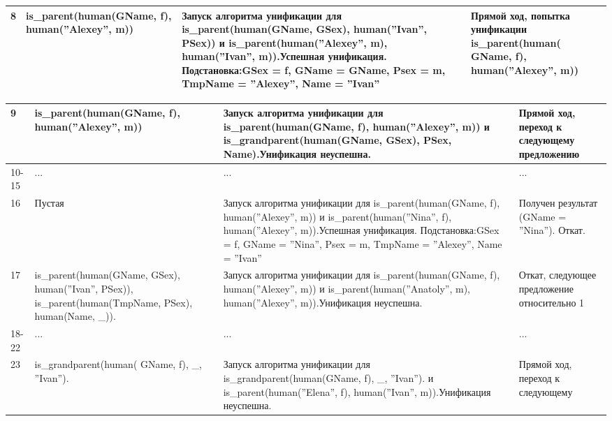\documentclass[12pt]{report}
\begin{document}
\begin{table}[H]
\begin{center}
\begin{tabular}{|p{1 cm}|p{5 cm}|p{8.5 cm}|p{4 cm}|}
			\hline 
			8 & is\_parent(human(GName, f), human(''Alexey'', m)) & Запуск алгоритма унификации для is\_parent(human(GName, GSex), human(''Ivan'', PSex)) и is\_parent(human(''Alexey'', m), human(''Ivan'', m)).\newline Успешная унификация. Подстановка:\newline GSex = f, GName = GName, Psex = m, TmpName = ''Alexey'', Name = ''Ivan'' & Прямой ход, попытка унификации is\_parent(human( GName, f), human(''Alexey'', m)) \\
			\hline  
		\end{tabular}
	\end{center}
\end{table} 

\begin{table}[H]
	\begin{center}
		\begin{tabular}{|p{1 cm}|p{5 cm}|p{8.5 cm}|p{4 cm}|}
			\hline 
			9 & is\_parent(human(GName, f), human(''Alexey'', m))  & Запуск алгоритма унификации для is\_parent(human(GName, f), human(''Alexey'', m))
			и is\_grandparent(human(GName, GSex), PSex, Name).\newline Унификация неуспешна. &
			Прямой ход, переход к следующему
			предложению \\
			\hline 
			10-15 & ... & ... & ... \\
			\hline 
			16 &  Пустая  & 
			Запуск алгоритма унификации для is\_parent(human(GName, f), human(''Alexey'', m))
			и is\_parent(human(''Nina'', f), human(''Alexey'', m)).\newline Успешная унификация. Подстановка:\newline GSex = f, GName = ''Nina'', Psex = m, TmpName = ''Alexey'', Name = ''Ivan'' & 
			Получен результат (GName = ''Nina''). Откат. \\
			\hline 
			17 &
			is\_parent(human(GName, GSex), human(''Ivan'', PSex)),
			is\_parent(human(TmpName, PSex), human(Name, \_)). &
			Запуск алгоритма унификации для is\_parent(human(GName, f), human(''Alexey'', m))
			и is\_parent(human(''Anatoly'', m), human(''Alexey'', m)).\newline Унификация неуспешна. &
			Откат, следующее предложение
			относительно 1 \\
			\hline 
			18-22 & ... & ... &  ... \\
			\hline 
			23 & is\_grandparent(human( GName, f), \_, ''Ivan''). &
			Запуск алгоритма унификации для is\_grandparent(human(GName, f), \_, ''Ivan'').
			и is\_parent(human(''Elena'', f), human(''Ivan'', m)).\newline Унификация неуспешна. & Прямой ход, переход к следующему

\end{tabular}
\end{center}
\end{table}
\end{document}

